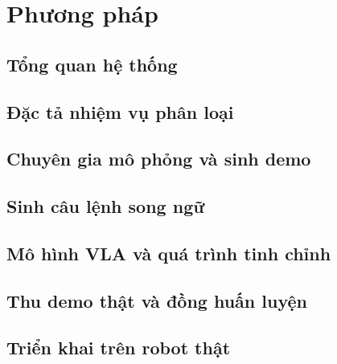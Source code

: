 \section{Phương pháp}
\label{sec:method}

\subsection{Tổng quan hệ thống}

\subsection{Đặc tả nhiệm vụ phân loại}

\subsection{Chuyên gia mô phỏng và sinh demo}

\subsection{Sinh câu lệnh song ngữ}

\subsection{Mô hình VLA và quá trình tinh chỉnh}

\subsection{Thu demo thật và đồng huấn luyện}

\subsection{Triển khai trên robot thật}
